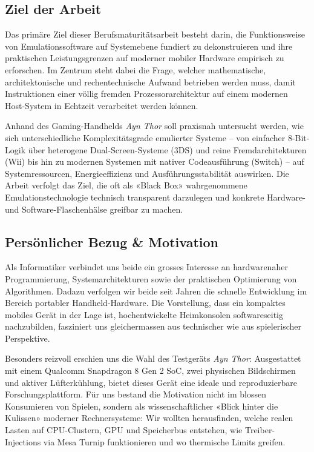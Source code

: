 \documentclass[12pt,a4paper]{scrartcl}
\begin{document}
\subsection{Ziel der Arbeit}
Das primäre Ziel dieser Berufsmaturitätsarbeit besteht darin, die Funktionsweise von Emulationssoftware auf Systemebene fundiert zu dekonstruieren und ihre praktischen Leistungsgrenzen auf moderner mobiler Hardware empirisch zu erforschen. Im Zentrum steht dabei die Frage, welcher mathematische, architektonische und rechentechnische Aufwand betrieben werden muss, damit Instruktionen einer völlig fremden Prozessorarchitektur auf einem modernen Host-System in Echtzeit verarbeitet werden können.

Anhand des Gaming-Handhelds \textit{Ayn Thor} soll praxisnah untersucht werden, wie sich unterschiedliche Komplexitätsgrade emulierter Systeme -- von einfacher 8-Bit-Logik über heterogene Dual-Screen-Systeme (3DS) und reine Fremdarchitekturen (Wii) bis hin zu modernen Systemen mit nativer Codeausführung (Switch) -- auf Systemressourcen, Energieeffizienz und Ausführungsstabilität auswirken. Die Arbeit verfolgt das Ziel, die oft als «Black Box» wahrgenommene Emulationstechnologie technisch transparent darzulegen und konkrete Hardware- und Software-Flaschenhälse greifbar zu machen.

\subsection{Persönlicher Bezug \& Motivation}
Als Informatiker verbindet uns beide ein grosses Interesse an hardwarenaher Programmierung, Systemarchitekturen sowie der praktischen Optimierung von Algorithmen.
Dadazu verfolgen wir beide seit Jahren die schnelle Entwicklung im Bereich portabler Handheld-Hardware. Die Vorstellung, dass ein kompaktes mobiles Gerät in der Lage ist, hochentwickelte Heimkonsolen softwareseitig nachzubilden, fasziniert uns gleichermassen aus technischer wie aus spielerischer Perspektive.

Besonders reizvoll erschien uns die Wahl des Testgeräts \textit{Ayn Thor}: Ausgestattet mit einem Qualcomm Snapdragon 8 Gen 2 SoC, zwei physischen Bildschirmen und aktiver Lüfterkühlung, bietet dieses Gerät eine ideale und reproduzierbare Forschungsplattform. Für uns bestand die Motivation nicht im blossen Konsumieren von Spielen, sondern als wissenschaftlicher «Blick hinter die Kulissen» moderner Rechnersysteme: Wir wollten herausfinden, welche realen Lasten auf CPU-Clustern, GPU und Speicherbus entstehen, wie Treiber-Injections via Mesa Turnip funktionieren und wo thermische Limits greifen.
\end{document}
